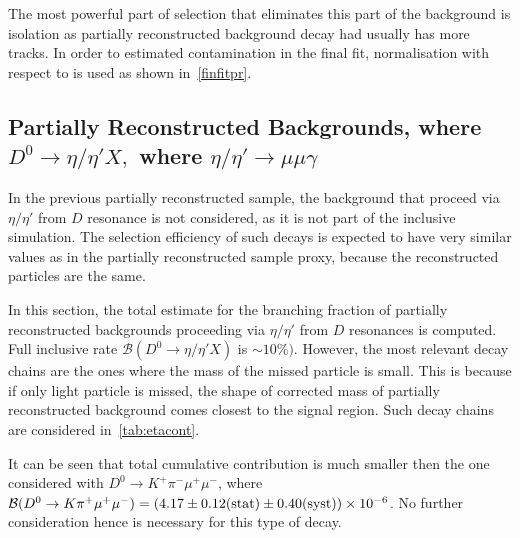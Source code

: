 The most powerful part of selection that eliminates this part of the background is isolation as partially reconstructed background decay had usually has more tracks. In order to estimated contamination in the final fit, normalisation with respect to \bjpsimumuk is used as shown in~\autoref{finfitpr}.

\subsection{Partially Reconstructed Backgrounds, where $D^{0} \rightarrow \eta / \eta' X,$ where $\eta / \eta' \rightarrow \mu \mu \gamma$}
\label{etasec}
In the previous partially reconstructed sample, the background that proceed via $\eta/\eta'$ from $D$ resonance is not considered, as it is not part of the inclusive simulation. The selection efficiency of such decays is expected to have very similar values as in the partially reconstructed sample proxy, because the reconstructed particles are the same.

In this section, the total estimate for the branching fraction of partially reconstructed backgrounds proceeding via $\eta/\eta'$ from $D$ resonances is computed. Full inclusive rate $\mathcal{B} (D^{0} \rightarrow \eta / \eta' X)$ is $ \sim 10 \%)$. However, the most relevant decay chains are the ones where the mass of the missed particle is small. This is because if only light particle is missed, the shape of corrected mass of partially reconstructed background comes closest to the signal region. Such decay chains are considered in~\autoref{tab:etacont}.

It can be seen that total cumulative contribution is much smaller then the one considered with $D^{0}\rightarrow K^{+} \pi^{-} \mu^{+} \mu^{-}$, where $\mathcal{B}(D^0 \rightarrow K \pi^+ \mu^{+} \mu^{-}) = (4.17\pm0.12 \rm{(stat)}\pm 0.40 \rm{(syst)})\times 10^{-6}$\cite{Aaij:2015hva}. No further consideration hence is necessary for this type of decay.

